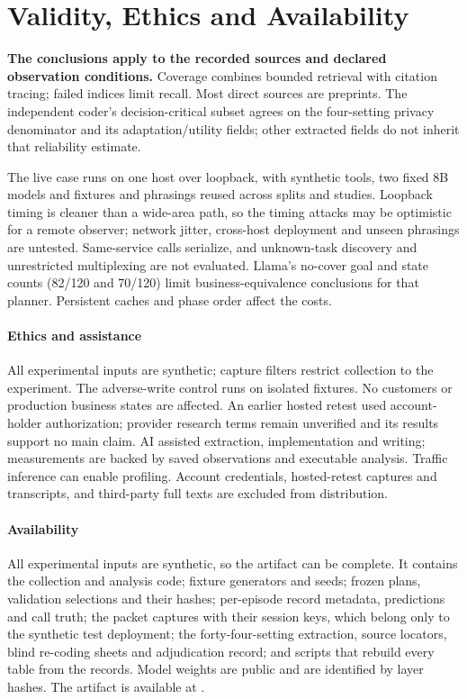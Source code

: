 \section{Validity, Ethics and Availability}\label{sec:validity}
\textbf{The conclusions apply to the recorded sources and declared observation conditions.}
Coverage combines bounded retrieval with citation tracing; failed indices limit recall. Most direct sources are preprints. The independent coder's decision-critical subset agrees on the four-setting privacy denominator and its adaptation/utility fields; other extracted fields do not inherit that reliability estimate.

The live case runs on one host over loopback, with synthetic tools, two fixed 8B models and fixtures and phrasings reused across splits and studies. Loopback timing is cleaner than a wide-area path, so the timing attacks may be optimistic for a remote observer; network jitter, cross-host deployment and unseen phrasings are untested. Same-service calls serialize, and unknown-task discovery and unrestricted multiplexing are not evaluated. Llama's no-cover goal and state counts (82/120 and 70/120) limit business-equivalence conclusions for that planner. Persistent caches and phase order affect the costs.

\paragraph{Ethics and assistance}
All experimental inputs are synthetic; capture filters restrict collection to the experiment. The adverse-write control runs on isolated fixtures. No customers or production business states are affected. An earlier hosted retest used account-holder authorization; provider research terms remain unverified and its results support no main claim. AI assisted extraction, implementation and writing; measurements are backed by saved observations and executable analysis. Traffic inference can enable profiling. Account credentials, hosted-retest captures and transcripts, and third-party full texts are excluded from distribution.

\paragraph{Availability}
All experimental inputs are synthetic, so the artifact can be complete. It contains the collection and analysis code; fixture generators and seeds; frozen plans, validation selections and their hashes; per-episode record metadata, predictions and call truth; the packet captures with their session keys, which belong only to the synthetic test deployment; the forty-four-setting extraction, source locators, blind re-coding sheets and adjudication record; and scripts that rebuild every table from the records. Model weights are public and are identified by layer hashes. The artifact is available at \artifacturl.

